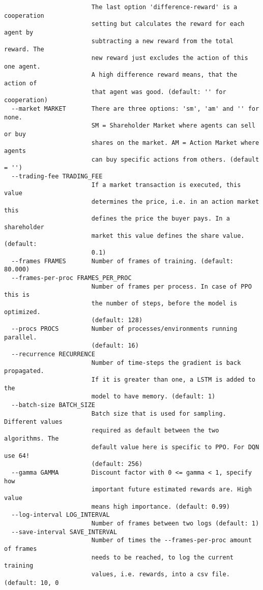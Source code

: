 {\begin{verbatim}
                        The last option 'difference-reward' is a cooperation
                        setting but calculates the reward for each agent by
                        subtracting a new reward from the total reward. The
                        new reward just excludes the action of this one agent.
                        A high difference reward means, that the action of
                        that agent was good. (default: '' for cooperation)
  --market MARKET       There are three options: 'sm', 'am' and '' for none.
                        SM = Shareholder Market where agents can sell or buy
                        shares on the market. AM = Action Market where agents
                        can buy specific actions from others. (default = '')
  --trading-fee TRADING_FEE
                        If a market transaction is executed, this value
                        determines the price, i.e. in an action market this
                        defines the price the buyer pays. In a shareholder
                        market this value defines the share value. (default:
                        0.1)
  --frames FRAMES       Number of frames of training. (default: 80.000)
  --frames-per-proc FRAMES_PER_PROC
                        Number of frames per process. In case of PPO this is
                        the number of steps, before the model is optimized.
                        (default: 128)
  --procs PROCS         Number of processes/environments running parallel.
                        (default: 16)
  --recurrence RECURRENCE
                        Number of time-steps the gradient is back propagated.
                        If it is greater than one, a LSTM is added to the
                        model to have memory. (default: 1)
  --batch-size BATCH_SIZE
                        Batch size that is used for sampling. Different values
                        required as default between the two algorithms. The
                        default value here is specific to PPO. For DQN use 64!
                        (default: 256)
  --gamma GAMMA         Discount factor with 0 <= gamma < 1, specify how
                        important future estimated rewards are. High value
                        means high importance. (default: 0.99)
  --log-interval LOG_INTERVAL
                        Number of frames between two logs (default: 1)
  --save-interval SAVE_INTERVAL
                        Number of times the --frames-per-proc amount of frames
                        needs to be reached, to log the current training
                        values, i.e. rewards, into a csv file. (default: 10, 0

\end{verbatim}}
